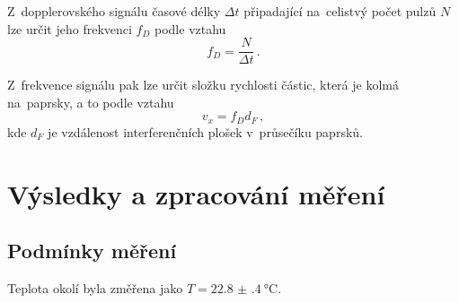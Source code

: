 \documentclass{../concepts/titul_zprava_p/prepareprotokolZprava} %
\begin{document}

Z~dopplerovského signálu časové délky $\Delta t$ připadající na~celistvý počet pulzů $N$ lze určit jeho frekvenci 
$f_D$ podle vztahu \cite{pokyny}
\begin{equation}
    \label{eq:frekvence}
    f_D = \frac{N}{\Delta t} \,.
\end{equation}

Z~frekvence signálu pak lze určit složku rychlosti částic, která je kolmá na~paprsky, a to podle vztahu \cite{studijni}
\begin{equation}
    \label{eq:rychlost}
    v_x = f_D d_F \,,
\end{equation}
kde $d_F$ je vzdálenost interferenčních plošek v~průsečíku paprsků.

\section{Výsledky a zpracování měření}

\subsection{Podmínky měření}
Teplota okolí byla změřena jako $T = \qty{22.8(4)}{\degreeCelsius}$.

\end{document}
